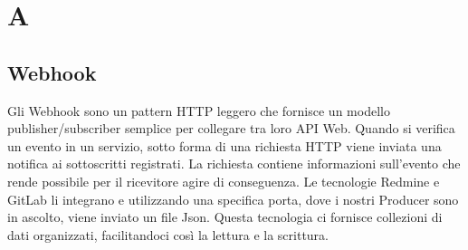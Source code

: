 \newpage
\section{A}
	\subsection{Webhook}
		Gli Webhook sono un pattern HTTP leggero che fornisce un modello publisher/subscriber semplice
		per collegare tra loro API Web.	
		Quando si verifica un evento in un servizio, sotto forma di una richiesta HTTP viene inviata una
		notifica ai sottoscritti registrati. La richiesta contiene informazioni sull'evento che rende
		possibile per il ricevitore agire di conseguenza.
		Le tecnologie Redmine e GitLab li integrano e utilizzando una specifica porta, dove i nostri
		Producer sono in ascolto, viene inviato un file Json. Questa tecnologia ci fornisce
		collezioni di dati organizzati, facilitandoci così la lettura e la scrittura.
		
